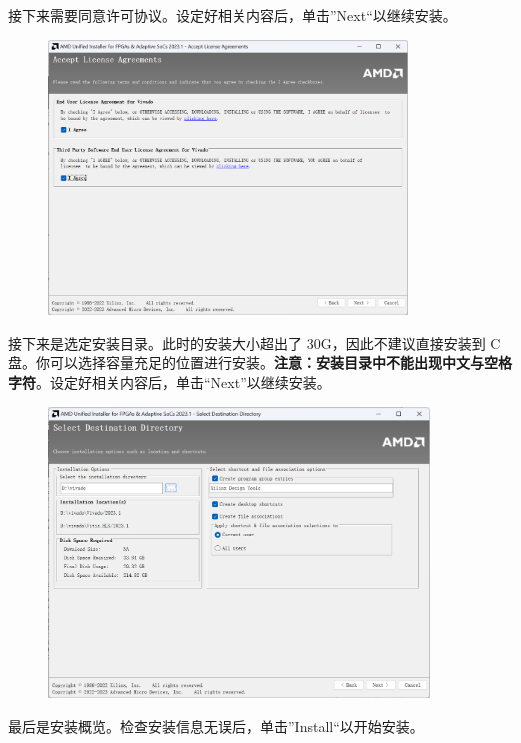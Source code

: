 \documentclass{ctexart}
\begin{document}
接下来需要同意许可协议。设定好相关内容后，单击”Next“以继续安装。

\begin{figure}[H]
    \centering
    \includegraphics[width=0.85\textwidth]{lab0/8.png}
\end{figure}

接下来是选定安装目录。此时的安装大小超出了 30G，因此不建议直接安装到 C 盘。你可以选择容量充足的位置进行安装。\textbf{注意：安装目录中不能出现中文与空格字符}。设定好相关内容后，单击“Next”以继续安装。

\begin{figure}[H]
    \centering
    \includegraphics[width=0.9\textwidth]{lab0/9.png}
\end{figure}

最后是安装概览。检查安装信息无误后，单击”Install“以开始安装。
\end{document}

